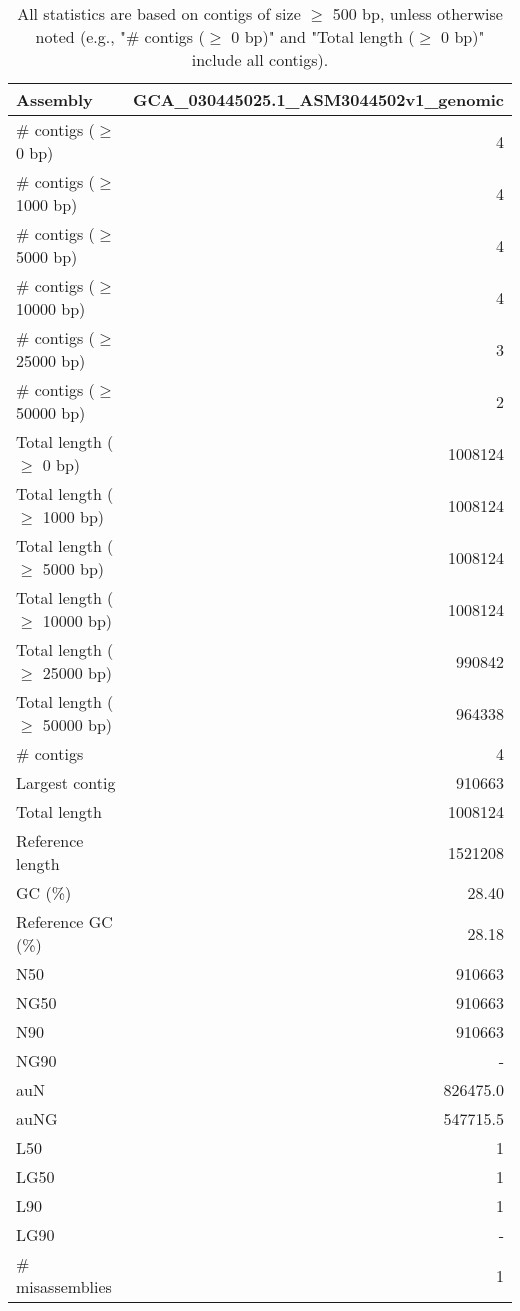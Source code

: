 \documentclass[12pt,a4paper]{article}
\begin{document}
\begin{table}[ht]
\begin{center}
\caption{All statistics are based on contigs of size $\geq$ 500 bp, unless otherwise noted (e.g., "\# contigs ($\geq$ 0 bp)" and "Total length ($\geq$ 0 bp)" include all contigs).}
\begin{tabular}{|l*{1}{|r}|}
\hline
Assembly & GCA\_030445025.1\_ASM3044502v1\_genomic \\ \hline
\# contigs ($\geq$ 0 bp) & 4 \\ \hline
\# contigs ($\geq$ 1000 bp) & 4 \\ \hline
\# contigs ($\geq$ 5000 bp) & 4 \\ \hline
\# contigs ($\geq$ 10000 bp) & 4 \\ \hline
\# contigs ($\geq$ 25000 bp) & 3 \\ \hline
\# contigs ($\geq$ 50000 bp) & 2 \\ \hline
Total length ($\geq$ 0 bp) & 1008124 \\ \hline
Total length ($\geq$ 1000 bp) & 1008124 \\ \hline
Total length ($\geq$ 5000 bp) & 1008124 \\ \hline
Total length ($\geq$ 10000 bp) & 1008124 \\ \hline
Total length ($\geq$ 25000 bp) & 990842 \\ \hline
Total length ($\geq$ 50000 bp) & 964338 \\ \hline
\# contigs & 4 \\ \hline
Largest contig & 910663 \\ \hline
Total length & 1008124 \\ \hline
Reference length & 1521208 \\ \hline
GC (\%) & 28.40 \\ \hline
Reference GC (\%) & 28.18 \\ \hline
N50 & 910663 \\ \hline
NG50 & 910663 \\ \hline
N90 & 910663 \\ \hline
NG90 & - \\ \hline
auN & 826475.0 \\ \hline
auNG & 547715.5 \\ \hline
L50 & 1 \\ \hline
LG50 & 1 \\ \hline
L90 & 1 \\ \hline
LG90 & - \\ \hline
\# misassemblies & 1 \\ \hline

\end{tabular}
\end{center}
\end{table}
\end{document}

